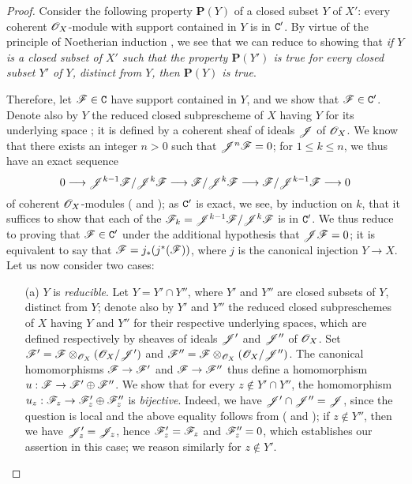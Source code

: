 \begin{proof}
Consider the following property $\textbf{P}(Y)$ of a closed subset $Y$ of $X'$: every coherent $\mathscr{O}_X$-module with support contained in $Y$ is in $\mathtt{C}'$.
By virtue of the principle of Noetherian induction , we see that we can reduce to showing that \emph{if $Y$ is a closed subset of $X'$ such that the property $\textbf{P}(Y')$ is true for every closed subset $Y'$ of $Y$, distinct from $Y$, then $\textbf{P}(Y)$ is true}.

Therefore, let $\mathscr{F}\in\mathtt{C}$ have support contained in $Y$, and we show that $\mathscr{F}\in\mathtt{C}'$.
Denote also by $Y$ the reduced closed subprescheme of $X$ having $Y$ for its underlying space ; it is defined by a coherent sheaf of ideals $\mathscr{J}$ of $\mathscr{O}_X$.
We know  that there exists an integer $n>0$ such that $\mathscr{J}^n\mathscr{F}=0$; for $1\leq k\leq n$, we thus have an exact sequence
\[
  0\to\sh{J}^{k-1}\sh{F}/\sh{J}^k\sh{F}\to\sh{F}/\sh{J}^k\sh{F}\to\sh{F}/\sh{J}^{k-1}\sh{F}\to 0
\]
 of coherent $\mathscr{O}_X$-modules ( and ); as $\mathtt{C}'$ is exact, we see, by induction on $k$, that it suffices to show that each of the $\mathscr{F}_k=\mathscr{J}^{k-1}\mathscr{F}/\mathscr{J}^k\mathscr{F}$ is in $\mathtt{C}'$.
We thus reduce to proving that $\mathscr{F}\in\mathtt{C}'$ under the additional hypothesis that $\mathscr{J}\mathscr{F}=0$; it is equivalent to say that $\mathscr{F}=j_*(j^*(\mathscr{F}))$, where $j$ is the canonical injection $Y\to X$.
Let us now consider two cases:
\begin{enumerate}
  \item[(a)] $Y$ is \emph{reducible}.
    Let $Y=Y'\cap Y''$, where $Y'$ and $Y''$ are closed subsets of $Y$, distinct from $Y$; denote also by $Y'$ and $Y''$ the reduced closed subpreschemes of $X$ having $Y$ and $Y''$ for their respective underlying spaces, which are defined respectively by sheaves of ideals $\mathscr{J}'$ and $\mathscr{J}''$ of $\mathscr{O}_X$.
    Set $\mathscr{F}'=\mathscr{F}\otimes_{\mathscr{O}_X}(\mathscr{O}_X/\mathscr{J}')$ and $\mathscr{F}''=\mathscr{F}\otimes_{\mathscr{O}_X}(\mathscr{O}_X/\mathscr{J}'')$.
    The canonical homomorphisms $\sh{F}\to\sh{F}'$ and $\sh{F}\to\sh{F}''$ thus define a homomorphism $u:\sh{F}\to\sh{F}'\oplus\sh{F}''$.
    We show that for every $z\not\in Y'\cap Y''$, the homomorphism $u_z:\sh{F}_z\to\sh{F}_z'\oplus\sh{F}_z''$ is \emph{bijective}.
    Indeed, we have $\mathscr{J}'\cap\mathscr{J}''=\mathscr{J}$, since the question is local and
    the above equality follows from ( and ); if $z\not\in Y''$, then we have $\mathscr{J}_z'=\mathscr{J}_z$, hence $\mathscr{F}_z'=\mathscr{F}_z$ and $\mathscr{F}_z''=0$, which establishes our assertion in this case; we reason similarly for $z\not\in Y'$.

\end{enumerate}
\end{proof}
